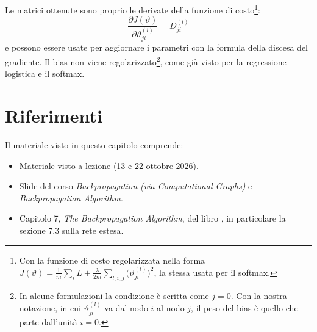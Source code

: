 Le matrici ottenute sono proprio le derivate della funzione di costo\footnote{Con la funzione di costo regolarizzata nella forma $J(\vartheta) = \frac{1}{m}\sum_{i} L + \frac{\lambda}{2m}\sum_{l,i,j}\big(\vartheta_{ji}^{(l)}\big)^2$, la stessa usata per il softmax.}:
\[
\frac{\partial J(\vartheta)}{\partial \vartheta_{ji}^{(l)}} = D_{ji}^{(l)}
\]
e possono essere usate per aggiornare i parametri con la formula della discesa del gradiente. Il bias non viene regolarizzato\footnote{In alcune formulazioni la condizione è scritta come $j = 0$. Con la nostra notazione, in cui $\vartheta_{ji}^{(l)}$ va dal nodo $i$ al nodo $j$, il peso del bias è quello che parte dall'unità $i = 0$.}, come già visto per la regressione logistica e il softmax.

\section*{Riferimenti}
Il materiale visto in questo capitolo comprende:
\begin{itemize}
    \item Materiale visto a lezione (13 e 22 ottobre 2026).
    \item Slide del corso \emph{Backpropagation (via Computational Graphs)} e \emph{Backpropagation Algorithm}.
    \item Capitolo 7, \emph{The Backpropagation Algorithm}, del libro  \cite{Rojas1996}, in particolare la sezione 7.3 sulla rete estesa.
\end{itemize}
